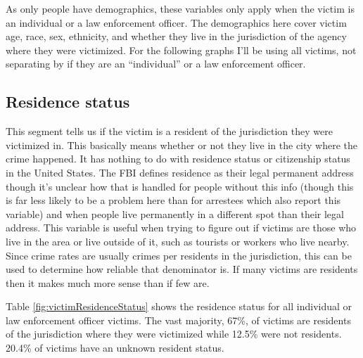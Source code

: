 \documentclass[
  12pt,
  openany]{book}
\begin{document}
As only people have demographics, these variables only apply when the victim is an individual or a law enforcement officer. The demographics here cover victim age, race, sex, ethnicity, and whether they live in the jurisdiction of the agency where they were victimized. For the following graphs I'll be using all victims, not separating by if they are an ``individual'' or a law enforcement officer.

\subsection{Residence status}\label{residence-status}

This segment tells us if the victim is a resident of the jurisdiction they were victimized in. This basically means whether or not they live in the city where the crime happened. It has nothing to do with residence status or citizenship status in the United States. The FBI defines residence as their legal permanent address though it's unclear how that is handled for people without this info (though this is far less likely to be a problem here than for arrestees which also report this variable) and when people live permanently in a different spot than their legal address. This variable is useful when trying to figure out if victims are those who live in the area or live outside of it, such as tourists or workers who live nearby. Since crime rates are usually crimes per residents in the jurisdiction, this can be used to determine how reliable that denominator is. If many victims are residents then it makes much more sense than if few are.

Table \ref{fig:victimResidenceStatus} shows the residence status for all individual or law enforcement officer victims. The vast majority, 67\%, of victims are residents of the jurisdiction where they were victimized while 12.5\% were not residents. 20.4\% of victims have an unknown resident status.
\end{document}
